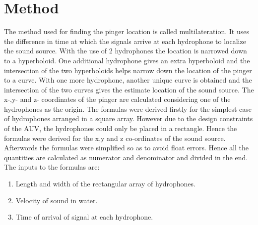 \section{Method}\label{sec:method}
The method used for finding the pinger location is called multilateration. It uses the difference in time at which the signals arrive at each hydrophone to localize the sound source. With the use of 2 hydrophones the location is narrowed down to a hyperboloid. One additional hydrophone gives an extra hyperboloid and the intersection of the two hyperboloids helps narrow down the location of the pinger to a curve. With one more hydrophone, another unique curve is obtained and the intersection of the two curves gives the estimate location of the sound source. The x-,y- and z- coordinates of the pinger are calculated considering one of the hydrophones as the origin.\newline
The formulas were derived firstly for the simplest case of hydrophones arranged in a square array. However due to the design constraints of the AUV, the hydrophones could only be placed in a rectangle. Hence the formulas were derived for the x,y and z co-ordinates of the sound source. Afterwords the formulas were simplified so as to avoid float errors. Hence all the quantities are calculated as numerator and denominator and divided in the end.\newline
The inputs to the formulas are:\begin{enumerate}
\item Length and width of the rectangular array of hydrophones.
\item Velocity of sound in water.
\item Time of arrival of signal at each hydrophone.
\end{enumerate}


